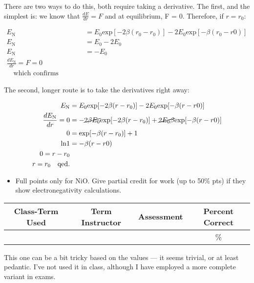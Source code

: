 \begin{solution}

There are two ways to do this, both require taking a derivative. The first, and the simplest is: we know that $\frac{dE}{dr} = F$ and at equilibrium, F = 0. Therefore, if $r = r_0$:

\begin{align}
	E_\text{N} &= E_0 \text{exp}[-2 \beta(r_0-r_0)]-2E_0 \text{exp}[-\beta(r_0-r0)]\\
	E_\text{N} &= E_0 -2E_0 \\
	E_\text{N} &= -E_0\\
	\frac{dE_\text{N}}{dr} = F = 0\\ \quad \text{which confirms equilibrium.}
\end{align}

The second, longer route is to take the derivatives right away:

\begin{align}
	E_\text{N} &= E_0 \text{exp}[-2 \beta(r-r_0)]-2E_0 \text{exp}[-\beta(r-r0)]\\
	\frac{dE_\text{N}}{dr} = 0 &= -\cancel{2 \beta E_0} \text{exp}[-2 \beta(r-r_0)]+\cancel{2 E_0 \beta} \text{exp}[-\beta(r-r0)]\\
	0 &= \text{exp}[-\beta(r-r_0)]+1\\
	\text{ln}1 &= -\beta(r-r0)\\
	0 = r - r_0\\
	r = r_0 \quad \text{qed}.
\end{align}

\end{solution}

\begin{rubric}

\begin{itemize}
	\item Full points only for NiO. Give partial credit for work (up to 50\% pts) if they show electronegativity calculations.
\end{itemize}

\end{rubric}

\begin{outcomes}
	\begin{center}
		\begin{tabular}{cccc}
			\hline\hline
			Class-Term Used & Term Instructor & Assessment & Percent Correct\\
			\hline
			 &  &  & \%\\    %
			\hline
		\end{tabular}
	\end{center}
\end{outcomes}

\begin{comments}

This one can be a bit tricky based on the values --- it seems trivial, or at least pedantic.
 I've not used it in class, although I have employed a more complete variant in exams.	
\end{comments}
